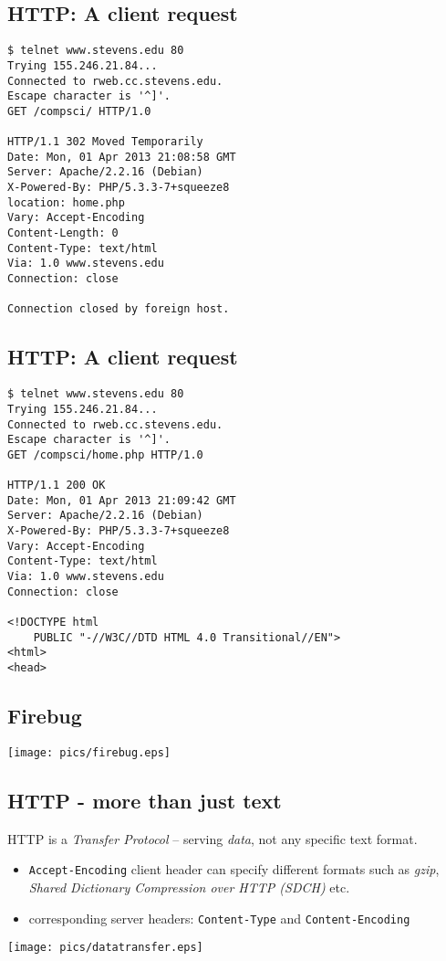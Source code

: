 \documentclass[xga]{xdvislides}
\begin{document}
\subsection{HTTP: A client request}
\smallish
\begin{verbatim}
$ telnet www.stevens.edu 80
Trying 155.246.21.84...
Connected to rweb.cc.stevens.edu.
Escape character is '^]'.
GET /compsci/ HTTP/1.0

HTTP/1.1 302 Moved Temporarily
Date: Mon, 01 Apr 2013 21:08:58 GMT
Server: Apache/2.2.16 (Debian)
X-Powered-By: PHP/5.3.3-7+squeeze8
location: home.php
Vary: Accept-Encoding
Content-Length: 0
Content-Type: text/html
Via: 1.0 www.stevens.edu
Connection: close

Connection closed by foreign host.
\end{verbatim}

\subsection{HTTP: A client request}
\smallish
\begin{verbatim}
$ telnet www.stevens.edu 80
Trying 155.246.21.84...
Connected to rweb.cc.stevens.edu.
Escape character is '^]'.
GET /compsci/home.php HTTP/1.0

HTTP/1.1 200 OK
Date: Mon, 01 Apr 2013 21:09:42 GMT
Server: Apache/2.2.16 (Debian)
X-Powered-By: PHP/5.3.3-7+squeeze8
Vary: Accept-Encoding
Content-Type: text/html
Via: 1.0 www.stevens.edu
Connection: close

<!DOCTYPE html
	PUBLIC "-//W3C//DTD HTML 4.0 Transitional//EN">
<html>
<head>
\end{verbatim}

\subsection{Firebug}
\begin{center}
	\texttt{[image: pics/firebug.eps]}
\end{center}



\subsection{HTTP - more than just text}
HTTP is a {\em Transfer Protocol} -- serving {\em data}, not any specific
text format.

\begin{itemize}
	\item {\tt Accept-Encoding} client header can specify different formats
		such as {\em gzip}, {\em Shared Dictionary Compression over HTTP (SDCH)} etc.
	\item corresponding server headers: {\tt Content-Type} and
		{\tt Content-Encoding}
\end{itemize}
\begin{center}
	\texttt{[image: pics/datatransfer.eps]}
\end{center}
\end{document}
